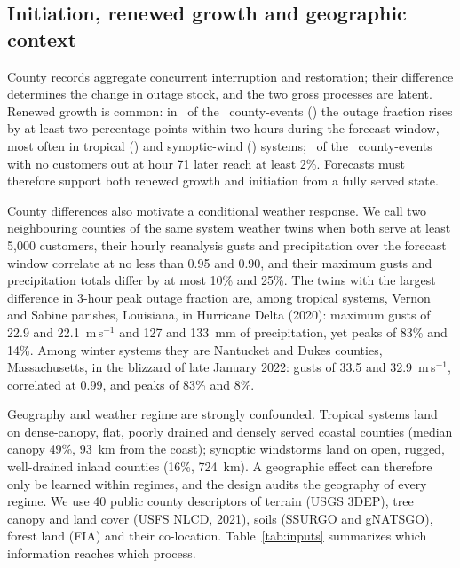 \documentclass[10pt,twocolumn,letterpaper]{article}
\begin{document}
\subsection{Initiation, renewed growth and geographic context}
\label{sec:context}
County records aggregate concurrent interruption and restoration; their difference determines the change in outage
stock, and the two gross processes are latent. Renewed growth is common: in \NRenewed\ of the \NEvents\ county-events
(\ShareRenewed) the outage fraction rises by at least two percentage points within two hours during the forecast
window, most often in tropical (\ShareRenewedTropical) and synoptic-wind (\ShareRenewedSynoptic) systems;
\NInitiated\ of the \NServedAtOrigin\ county-events with no customers out at hour 71 later reach at least 2\%. Forecasts must therefore support both renewed growth and initiation from a fully served
state.

County differences also motivate a conditional weather response. We call two neighbouring counties of the same
system weather twins when both serve at least 5,000 customers, their hourly reanalysis gusts and precipitation over the
forecast window correlate at no less than 0.95 and 0.90, and their maximum gusts and precipitation totals differ by at
most 10\% and 25\%. The twins with the largest difference in 3-hour peak outage fraction are, among tropical systems,
Vernon and Sabine parishes, Louisiana, in Hurricane Delta (2020): maximum gusts of 22.9 and 22.1~m\,s$^{-1}$ and 127
and 133~mm of precipitation, yet peaks of 83\% and 14\%. Among winter systems they are Nantucket and Dukes counties,
Massachusetts, in the blizzard of late January 2022: gusts of 33.5 and 32.9~m\,s$^{-1}$, correlated at 0.99, and peaks
of 83\% and 8\%.

Geography and weather regime are strongly confounded. Tropical systems land on dense-canopy, flat, poorly drained and
densely served coastal counties (median canopy 49\%, 93~km from the coast); synoptic windstorms land on open, rugged,
well-drained inland counties (16\%, 724~km). A geographic effect can therefore only be learned within regimes, and the
design audits the geography of every regime. We use 40 public county descriptors of terrain (USGS 3DEP), tree canopy and
land cover (USFS NLCD, 2021), soils (SSURGO and gNATSGO), forest land (FIA) and their co-location. Table~\ref{tab:inputs} summarizes which information
reaches which process.
\end{document}
